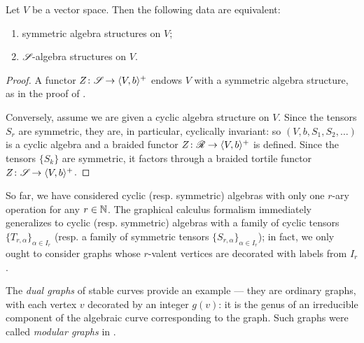 \begin{theorem}\label{thm:gc-sym}
  Let $V$ be a vector space. Then the following data are equivalent:
  \begin{enumerate}
  \item symmetric algebra structures on $V$;
  \item $\mathscr{S}_{}$-algebra structures on $V$.
  \end{enumerate}
\end{theorem}
\begin{proof}
  A functor $Z\colon\mathscr{S}_{}\to\langle V,b\rangle^+$ endows $V$ with a symmetric algebra
  structure, as in the proof of .
  
  Conversely, assume we are given a cyclic algebra structure on $V$.
  Since the tensors $S_r$ are symmetric, they are, in particular,
  cyclically invariant: so $(V,b,S_1,S_2,\dots)$ is a cyclic algebra
  and a braided functor $Z\colon\mathscr{R}_{}\to\langle V,b\rangle^+$ is defined.  Since the
  tensors $\{S_k\}$ are symmetric, it factors through a braided
  tortile functor $Z\colon\mathscr{S}_{}\to\langle V,b\rangle^+$.
\end{proof}
\begin{remark}
  \label{rem:many-sorted-graphs}
  So far, we have considered cyclic (resp. symmetric) algebras with
  only one $r$-ary operation for any $r\in\mathbb{N}$. The graphical calculus
  formalism immediately generalizes to cyclic (resp. symmetric)
  algebras with a family of cyclic tensors $\{T_{r,\alpha}\}_{\alpha\in
    I_r}$
  (resp. a family of symmetric tensors $\{S_{r,\alpha}\}_{\alpha\in
    I_r}$);
  in fact, we only ought to consider graphs whose $r$-valent vertices
  are decorated with labels from $I_r$.

  The \emph{dual graphs} of stable curves \cite{deligne-mumford} provide
  an example --- they are ordinary graphs, with each vertex $v$
  decorated by an integer $g(v)$: it is the genus of an irreducible
  component of the algebraic curve corresponding to the graph. Such
  graphs were called \emph{modular graphs} in \cite{getzler-kapranov}.
\end{remark}

